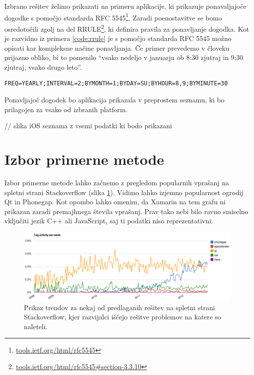 Izbrano rešitev želimo prikazati na primeru aplikacije, ki prikazuje ponavaljajoče dogodke s pomočjo standarda RFC 5545\footnote{\href{http://tools.ietf.org/html/rfc5545}{tools.ietf.org/html/rfc5545}}. Zaradi poenostavitve se bomo osredotočili zgolj na del RRULE{\footnote{\href{http://tools.ietf.org/html/rfc5545\#section-3.3.10}{tools.ietf.org/html/rfc5545\#section-3.3.10}}}, ki definira pravila za ponavljanje dogodka. Kot je razvidno iz primera \ref{code:rrule} je s pomočjo standarda RFC 5545 možno opisati kar kompleksne načine ponavljanja. Če primer prevedemo v človeku prijazno obliko, bi to pomenilo ``vsako nedeljo v januarju ob 8:30 zjutraj in 9:30 zjutraj, vsako drugo leto''.

\begin{lstlisting}[caption=Primer uporabe pravila RRULE standarda RFC 5545., label=code:rrule]
FREQ=YEARLY;INTERVAL=2;BYMONTH=1;BYDAY=SU;BYHOUR=8,9;BYMINUTE=30
\end{lstlisting}

Ponavljajoč dogodek bo aplikacija prikazala v preprostem seznamu, ki bo prilagojen za vsako od izbranih platform.

// slika iOS seznama z vsemi podatki ki bodo prikazani

\section{Izbor primerne metode}

Izbor primerne metode lahko začnemo z pregledom popularnih vprašanj na spletni strani Stackoverflow (slika \ref{fig:stackoverflow-trends}). Vidimo lahko izjemno popularnost ogrodij Qt in Phonegap. Kot opombo lahko omenim, da Xamarin na tem grafu ni prikazan zaradi premajhnega števila vprašanj. Prav tako nebi bilo ravno smiselno vključiti jezik C++ ali JavaScript, saj ti podatki niso reprezentativni.

\begin{figure}
 \includegraphics[width=\linewidth]{stackoverflow-trends}
 \caption{Prikaz trendov za nekaj od predlaganih rešitev na spletni strani Stackoverflow, kjer razvijalci iščejo rešitve problemov na katere so naleteli.}
 \label{fig:stackoverflow-trends}
\end{figure}

